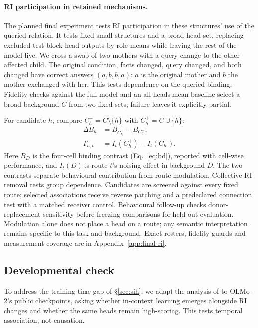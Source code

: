 \paragraph{RI participation in retained mechanisms.}
The planned final experiment tests RI participation in these structures' use of
the queried relation. It tests fixed small structures and a
broad head set, replacing excluded test-block head outputs by role means while
leaving the rest of the model live. We cross a swap of two mothers with a query
change to the other affected child. The original condition, facts changed, query changed, and
both changed have correct answers $(a,b,b,a)$: $a$ is the original mother and $b$
the mother exchanged with her. This tests dependence on the queried binding.
Fidelity checks against the
full model and an all-heads-mean baseline select a broad background $C$ from two
fixed sets; failure leaves it explicitly partial.

For candidate $h$, compare $C_h^-=C\setminus\{h\}$ with $C_h^+=C\cup\{h\}$:
\begin{align}
\Delta B_h &= B_{C_h^+}-B_{C_h^-}, \label{eq:ri-functional}\\
\Gamma_{h,t} &= I_t(C_h^+)-I_t(C_h^-). \label{eq:ri-route}
\end{align}
Here $B_D$ is the four-cell binding contrast (Eq.~\ref{eq:bd}), reported with
cell-wise performance, and $I_t(D)$ is route $t$'s noising effect in background
$D$. The two contrasts separate behavioural contribution from route modulation.
Collective RI removal tests group dependence. Candidates are screened
against every fixed route; selected associations receive reverse patching and a
predeclared connection test with a matched receiver control. Behavioural
follow-up checks donor-replacement sensitivity before freezing comparisons for
held-out evaluation. Modulation alone does not place a head on a route; any
semantic interpretation remains specific to this task and background. Exact
rosters, fidelity guards and measurement coverage are in
Appendix~\ref{app:final-ri}.

\subsection{Developmental check}
\label{sec:method-dev}

To address the training-time gap of \S\ref{sec:sih}, we adapt the analysis of
\citet{ren2024semantic} to OLMo-2's public checkpoints, asking whether in-context
learning emerges alongside RI changes and whether the same heads remain
high-scoring. This tests temporal association, not causation.


